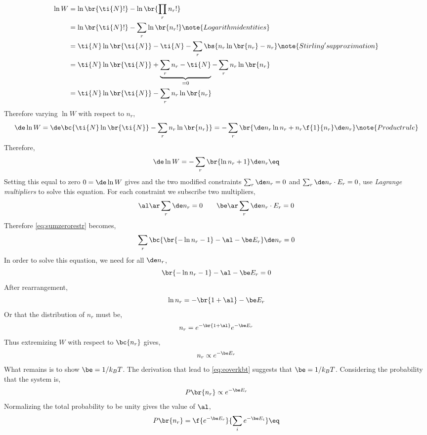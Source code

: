 \documentclass{article}
\begin{document}
\begin{align*}
    \ln W &= \ln\br{\ti{N}!} - \ln\br{\prod_{r}n_r!} \\
    &= \ln\br{\ti{N}!} - \sum_{r}\ln\br{n_r!} \note{Logarithm identities} \\
    &= \ti{N}\ln\br{\ti{N}} - \ti{N} - \sum_{r}\bs{n_r\ln\br{n_r} - n_r} \note{Stirling's approximation}\\
    &= \ti{N}\ln\br{\ti{N}} + \underbrace{\sum_{r} n_r - \ti{N}}_{=0} - \sum_{r}n_r\ln\br{n_r} \\
    &= \ti{N}\ln\br{\ti{N}} - \sum_{r}n_r\ln\br{n_r}
\end{align*}
Therefore varying $\ln W$ with respect to $n_r$,
\[ \de\ln W = \de\bc{\ti{N}\ln\br{\ti{N}} - \sum_{r}n_r\ln\br{n_r}} = -\sum_{r}\br{\de n_r \ln n_r + n_r \f{1}{n_r} \de n_r} \note{Product rule}\]
Therefore,
\[ \de\ln W = -\sum_{r}\br{\ln n_r + 1}\de n_r \eq \label{eq:sumzerorestr}\]
Setting this equal to zero $0 = \de \ln W$ gives and the two modified constraints $\sum_r \de n_r = 0$ and $\sum_r \de n_r \cdot E_r = 0$, use \textit{Lagrange multipliers} to solve this equation. For each constraint we subscribe two multipliers,
\[ \al \ar \sum_r \de n_r = 0 \qquad \be \ar \sum_r \de n_r \cdot E_r= 0 \]
Therefore \ref{eq:sumzerorestr} becomes,
\[ \sum_r \bc{\br{-\ln n_r - 1} - \al - \be E_r} \de n_r = 0 \]
In order to solve this equation, we need for all $\de n_r$,
\[ \br{-\ln n_r - 1} - \al - \be E_r = 0 \]
After rearrangement,
\[ \ln n_r = -\br{1+\al} - \be E_r \]
Or that the distribution of $n_r$ must be,
\[ n_r = e^{-\br{1+\al}}e^{-\be E_r} \]
Thus extremizing $W$ with respect to $\bc{n_r}$ gives,
\[ n_r \propto e^{-\be E_r} \]
What remains is to show $\be = 1/k_B T$. The derivation that lead to \eqref{eq:eoverkbt} suggests that $\be = 1 / k_B T$. Considering the probability that the system is,
\[ P \br{n_r} \propto e^{-\be E_r} \]
Normalizing the total probability to be unity gives the value of $\al$,
\[ P \br{n_r} = \f{e^{-\be E_r}}{\sum_ie^{-\be E_i}} \eq \label{eq:overpartition} \]
\end{document}
